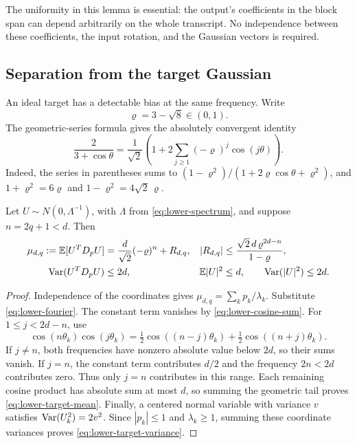 The uniformity in this lemma is essential: the output's coefficients in
the block span can depend arbitrarily on the whole transcript. No
independence between these coefficients, the input rotation, and the
Gaussian vectors is required.

\subsection{Separation from the target Gaussian}

An ideal target has a detectable bias at the same frequency. Write
\[
                         \varrho=3-\sqrt8\in(0,1).
\]
The geometric-series formula gives the absolutely convergent identity
\begin{equation}\label{eq:lower-fourier}
 \frac{2}{3+\cos\theta}
 =\frac1{\sqrt2}
   \left(1+2\sum_{j\ge1}(-\varrho)^j\cos(j\theta)\right).
\end{equation}
Indeed, the series in parentheses sums to
$(1-\varrho^2)/(1+2\varrho\cos\theta+\varrho^2)$, and
$1+\varrho^2=6\varrho$ and $1-\varrho^2=4\sqrt2\,\varrho$.

\begin{lemma}\label{lem:lower-target-statistic}
Let $U\sim N(0,\Lambda^{-1})$, with $\Lambda$ from
\eqref{eq:lower-spectrum}, and suppose $n=2q+1<d$. Then
\begin{align}
 \mu_{d,q}:=\mathbb E[U^TD_pU]
 &=\frac d{\sqrt2}(-\varrho)^n+R_{d,q},
 & |R_{d,q}|&\le
   \frac{\sqrt2\,d\,\varrho^{2d-n}}{1-\varrho},
 \label{eq:lower-target-mean}\\
 \operatorname{Var}(U^TD_pU)&\le2d,
 & \mathbb E|U|^2&\le d,\qquad \operatorname{Var}(|U|^2)\le2d.
 \label{eq:lower-target-variance}
\end{align}
\end{lemma}

\begin{proof}
Independence of the coordinates gives
$\mu_{d,q}=\sum_k p_k/\lambda_k$. Substitute
\eqref{eq:lower-fourier}. The constant term vanishes by
\eqref{eq:lower-cosine-sum}. For $1\le j<2d-n$, use
\[
 \cos(n\theta_k)\cos(j\theta_k)
 =\tfrac12\cos((n-j)\theta_k)+\tfrac12\cos((n+j)\theta_k).
\]
If $j\ne n$, both frequencies have nonzero absolute value below $2d$,
so their sums vanish. If $j=n$, the constant term contributes $d/2$
and the frequency $2n<2d$ contributes zero. Thus only $j=n$ contributes
in this range. Each remaining cosine product has
absolute sum at most $d$, so summing the geometric tail proves
\eqref{eq:lower-target-mean}. Finally, a centered normal variable with
variance $v$ satisfies $\operatorname{Var}(U_k^2)=2v^2$. Since
$|p_k|\le1$ and $\lambda_k\ge1$, summing these coordinate variances
proves \eqref{eq:lower-target-variance}.
\end{proof}

